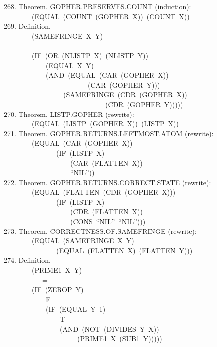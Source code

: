 \documentclass[10pt]{book}
\newenvironment{pubasis}{\begin{flushleft}}{\end{flushleft}}
\begin{document}
\begin{pubasis}
268.    Theorem.  GOPHER.PRESERVES.COUNT (induction):\\
~~~~~~~~(EQUAL~(COUNT~(GOPHER~X))~(COUNT~X))\\

269.    Definition.\\
~~~~~~~~(SAMEFRINGE~X~Y)\\
~~~~~~~~~~~=\\
~~~~~~~~(IF~(OR~(NLISTP~X)~(NLISTP~Y))\\
~~~~~~~~~~~~(EQUAL~X~Y)\\
~~~~~~~~~~~~(AND~(EQUAL~(CAR~(GOPHER~X))\\
~~~~~~~~~~~~~~~~~~~~~~~~(CAR~(GOPHER~Y)))\\
~~~~~~~~~~~~~~~~~(SAMEFRINGE~(CDR~(GOPHER~X))\\
~~~~~~~~~~~~~~~~~~~~~~~~~~~~~(CDR~(GOPHER~Y)))))\\

270.    Theorem.  LISTP.GOPHER (rewrite):\\
~~~~~~~~(EQUAL~(LISTP~(GOPHER~X))~(LISTP~X))\\

271.    Theorem.  GOPHER.RETURNS.LEFTMOST.ATOM (rewrite):\\
~~~~~~~~(EQUAL~(CAR~(GOPHER~X))\\
~~~~~~~~~~~~~~~(IF~(LISTP~X)\\
~~~~~~~~~~~~~~~~~~~(CAR~(FLATTEN~X))\\
~~~~~~~~~~~~~~~~~~~``NIL''))\\

272.    Theorem.  GOPHER.RETURNS.CORRECT.STATE (rewrite):\\
~~~~~~~~(EQUAL~(FLATTEN~(CDR~(GOPHER~X)))\\
~~~~~~~~~~~~~~~(IF~(LISTP~X)\\
~~~~~~~~~~~~~~~~~~~(CDR~(FLATTEN~X))\\
~~~~~~~~~~~~~~~~~~~(CONS~``NIL''~``NIL'')))\\

273.    Theorem.  CORRECTNESS.OF.SAMEFRINGE (rewrite):\\
~~~~~~~~(EQUAL~(SAMEFRINGE~X~Y)\\
~~~~~~~~~~~~~~~(EQUAL~(FLATTEN~X)~(FLATTEN~Y)))\\

274.    Definition.\\
~~~~~~~~(PRIME1~X~Y)\\
~~~~~~~~~~~=\\
~~~~~~~~(IF~(ZEROP~Y)\\
~~~~~~~~~~~~F\\
~~~~~~~~~~~~(IF~(EQUAL~Y~1)\\
~~~~~~~~~~~~~~~~T\\
~~~~~~~~~~~~~~~~(AND~(NOT~(DIVIDES~Y~X))\\
~~~~~~~~~~~~~~~~~~~~~(PRIME1~X~(SUB1~Y)))))\\


\end{pubasis}
\end{document}

